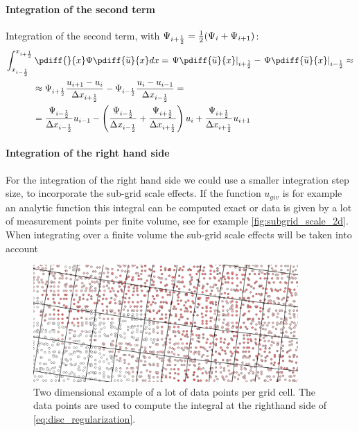\paragraph*{Integration of the second term}
Integration of the second term, with $\Psi_{i+\frac{1}{2}} = \frac{1}{2}(\Psi_{i} + \Psi_{i+1})$:
\begin{align}
\int_{x_{i-\half}}^{x_{i+\half}} &\, \pdiff{}{x} \Psi \pdiff{\widetilde u}{x} dx  =
\left. \Psi \pdiff{\widetilde u}{x} \right|_{i+\half} -  \left. \Psi \pdiff{\widetilde u}{x} \right|_{i-\half} \approx \\
& \approx \Psi_{i+\half} \frac{ u_{i+1} -  u_{i}}{\Dx_{i+\half}} - \Psi_{i-\half} \frac{ u_{i} -  u_{i-1}}{\Dx_{i-\half}} = \\
&=  \frac{\Psi_{i-\half}}{\Dx_{i-\half}}   u_{i-1}
-  \left( \frac{\Psi_{i-\half}}{{\Dx_{i-\half}}}
+  \frac{\Psi_{i+\half}}{{\Dx_{i+\half}}} \right)  u_{i}
+ \frac{\Psi_{i+\half}}{{\Dx_{i+\half}}}   u_{i+1}
\end{align}
\paragraph*{Integration of the right hand side}
For the integration of the right hand side we could use a smaller integration step size, to incorporate the sub-grid scale effects.
If the function $u_{giv}$ is for example an analytic function this integral can be computed exact or data is given by a lot of measurement points per finite volume, see for example \autoref{fig:subgrid_scale_2d}.
When integrating over a finite volume the sub-grid scale effects will be taken into account
\begin{figure}[H]
    \centering
    \includegraphics[width=0.9\textwidth]{figures/subgrid_scale_2d.png}
    \caption{Two dimensional example of a lot of data points per grid cell. The data points are used to compute the integral at the righthand side of \autoref{eq:disc_regularization}. \label{fig:subgrid_scale_2d}}
\end{figure}

